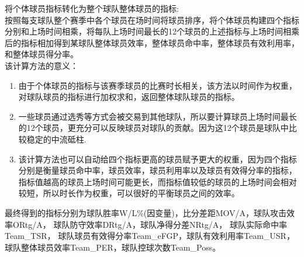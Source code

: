 \noindent 将个体球员指标转化为整个球队整体球员的指标:\\按照每支球队整个赛季中各个球员在场时间将球员排序，将个体球员构建四个指标分别和上场时间相乘，将每队上场时间最长的12个球员的上述指标与上场时间相乘后的指标相加得到某球队整体球员效率，整体球员命中率，整体球员有效利用率，和整体球员得分率。\\
该计算方法的意义：
	\begin{enumerate}
		\item  由于个体球员的指标与该赛季球员的比赛时长相关，该方法以时间作为权重，对球队球员的指标进行加权求和，返回整体球队球员的指标。
		\item 一些球员通过选秀等方式会被交易到其他球队，所以要计算球员上场时间最长的12个球员，更充分可以反映球员对球队的贡献。因为这12个球员是球队中比较稳定的中流砥柱.
		\item 该计算方法也可以自动给四个指标更高的球员赋予更大的权重，因为四个指标分别是衡量球员命中率，球员效率，球员利用率以及球员有效得分率的指标，指标值越高的球员上场时间可能更长，而指标值较低的球员的上场时间会相对较短，所以时长作为权重，可以很好的平衡球员之间的效率。
		
	\end{enumerate}
最终得到的指标分别为球队胜率W/L\%(因变量)，比分差距MOV/A，球队攻击效率ORtg/A， 球队防守效率DRtg/A，球队净得分差NRtg/A， 球队实际命中率Team\_TSR， 球队球员有效得分率Team\_eFGP，球队有效利用率Team\_USR，球队整体球员效率Team\_PER，球队控球次数Team\_Poss。